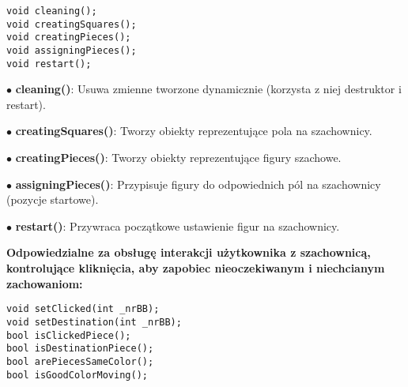 \documentclass[]{report}
\begin{document}
\begin{lstlisting}
void cleaning();
void creatingSquares();
void creatingPieces();
void assigningPieces();
void restart();
\end{lstlisting}
\begin{flushleft}
$\bullet$ \textbf{cleaning()}: Usuwa zmienne tworzone dynamicznie (korzysta z niej destruktor i restart).

$\bullet$ \textbf{creatingSquares()}: Tworzy obiekty reprezentujące pola na szachownicy.

$\bullet$ \textbf{creatingPieces()}: Tworzy obiekty reprezentujące figury szachowe.

$\bullet$ \textbf{assigningPieces()}: Przypisuje figury do odpowiednich pól na szachownicy (pozycje startowe).

$\bullet$ \textbf{restart()}: Przywraca początkowe ustawienie figur na szachownicy.

\textbf{Odpowiedzialne za obsługę interakcji użytkownika z szachownicą, kontrolujące kliknięcia, aby zapobiec nieoczekiwanym i niechcianym zachowaniom:}
\end{flushleft}
\begin{lstlisting}
void setClicked(int _nrBB);
void setDestination(int _nrBB);
bool isClickedPiece();
bool isDestinationPiece();
bool arePiecesSameColor();
bool isGoodColorMoving();
\end{lstlisting}
\end{document}
